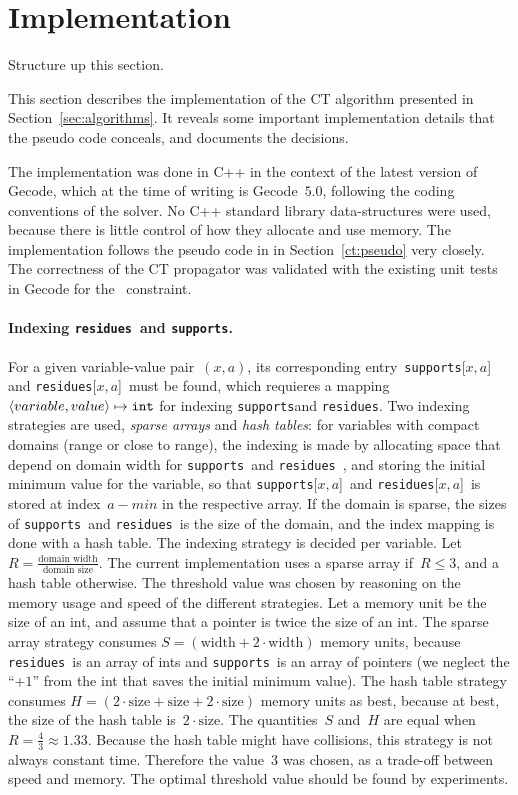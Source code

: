 \documentclass[a4paper,11pt]{article}
\newcommand{\Todo}[1]{{\color{blue}#1}}
\newcommand{\Secref}[1]{Section~\ref{#1}}
\newcommand{\Table}{\Constraint{Table}}
\newcommand{\Supports}{\texttt{supports}}
\newcommand{\Residues}{\texttt{residues}}
\numberwithin{equation}{section}
\begin{document}
\section{Implementation}
\label{sec:implementation}

\Todo{Structure up this section.}

This section describes the implementation of the CT algorithm presented in 
\Secref{sec:algorithms}. It reveals some important implementation details
that the pseudo code conceals, and documents the decisions.

The implementation was done in C++ in the context of the latest version of Gecode,
which at the time of writing is Gecode~$5.0$, following the coding conventions of
the solver.
No C++ standard library data-structures
were used, because there is little control of how they allocate and use memory.
The implementation follows the pseudo code in in \Secref{ct:pseudo} very closely.
The correctness of the CT propagator was validated with the existing unit tests
in Gecode for the \Table~constraint.


\paragraph{Indexing \Residues~and \Supports.}
For a given variable-value pair~$(x,a)$, its corresponding entry~\Supports[$x,a$]
and \Residues[$x,a$]~must be found, which requieres a mapping
$\left\langle variable,value\right\rangle \mapsto \texttt{int}$ for indexing \Supports and \Residues.
Two indexing strategies are used, \emph{sparse arrays} and \emph{hash tables}:
for variables with compact domains (range or close to range),
the indexing is made by allocating space that depend on domain width for
\Supports~and \Residues~, and storing the initial minimum value for the variable,
so that \Supports[$x,a$]~and \Residues[$x,a$]~is stored at index~$a - min$ in
the respective array. If the domain is sparse,
the sizes of \Supports~and \Residues~is the size of the domain, and the index mapping
is done with a hash table.
The indexing strategy is decided per variable.
Let~$R = \frac{\text{domain width}}{\text{domain size}}$.
The current implementation uses a sparse array if~$R \leq 3$, and a hash table
otherwise.
The threshold value was chosen by reasoning on the memory usage and speed
of the different strategies.
Let a memory unit be the size of an int, and assume that a pointer is twice
the size of an int. The sparse array 
strategy consumes $S = (\text{width} + 2 \cdot \text{width})$ memory units,
because \Residues~is an array of ints and \Supports~is an array of pointers
(we neglect the ``$+1$'' from the int that saves the initial minimum value).
The hash table strategy consumes 
$H = (2 \cdot \text{size} + \text{size} + 2 \cdot \text{size})$
memory units as best, because at best, the size of the hash table 
is~$2 \cdot \text{size}$.
The quantities~$S$ and~$H$ are equal when~$R = \frac{4}{3} \approx 1.33$.
Because the hash table might have collisions, this strategy is not always
constant time. Therefore the value~$3$ was chosen, as a trade-off between
speed and memory. The optimal threshold value should be found by
experiments.
\end{document}

